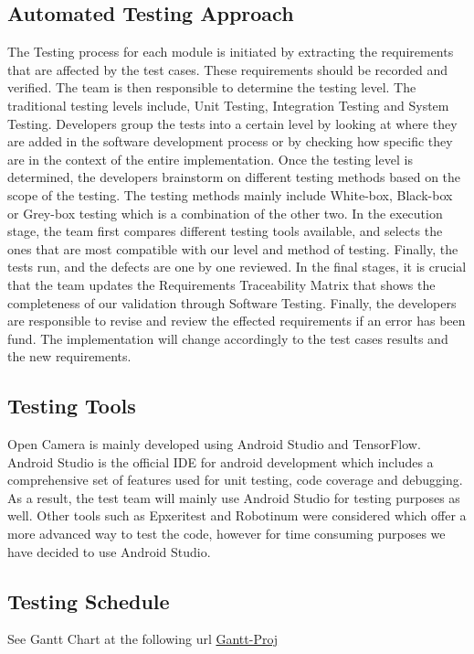 \documentclass[12pt, titlepage]{article}
\begin{document}
\subsection{Automated Testing Approach}
The Testing process for each module is initiated by extracting the requirements that are affected by the test cases. These requirements should be recorded and verified. The team is then responsible to determine the testing level. The traditional testing levels include, Unit Testing, Integration Testing and System Testing. Developers group the tests into a certain level by looking at where they are added in the software development process or by checking how specific they are in the context of the entire implementation.  Once the testing level is determined, the developers brainstorm on different testing methods based on the scope of the testing. The testing methods mainly include White-box, Black-box or Grey-box testing which is a combination of the other two. In the execution stage, the team first compares different testing tools available, and selects the ones that are most compatible with our level and method of testing. Finally, the tests run, and the defects are one by one reviewed. In the final stages, it is crucial that the team updates the Requirements Traceability Matrix that shows the completeness of our validation through Software Testing. Finally, the developers are responsible to revise and review the effected requirements if an error has been fund. The implementation will change accordingly to the test cases results and the new requirements.  

\subsection{Testing Tools}
Open Camera is mainly developed using Android Studio and TensorFlow. Android Studio is the official IDE for android development which includes a comprehensive set of features used for unit testing, code coverage and debugging. As a result, the test team will mainly use Android Studio for testing purposes as well. 	Other tools such as Epxeritest and Robotinum were considered which offer a more advanced way to test the code, however for time consuming purposes we have decided to use Android Studio. 
		
\subsection{Testing Schedule}
		
See Gantt Chart at the following url \href{https://gitlab.cas.mcmaster.ca/yazdinip/opencamerarefined/-/blob/master/Doc/DevelopmentPlan/Gantt.png}{Gantt-Proj}
\end{document}
